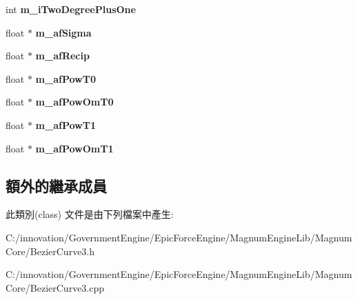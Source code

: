 \begin{DoxyCompactItemize}
\item 
int {\bfseries m\+\_\+i\+Two\+Degree\+Plus\+One}\hypertarget{class_i_dream_sky_1_1_bezier_curve3_a4541e2305ea9e03ce559b01f4544a3de}{}\label{class_i_dream_sky_1_1_bezier_curve3_a4541e2305ea9e03ce559b01f4544a3de}

\item 
float $\ast$ {\bfseries m\+\_\+af\+Sigma}\hypertarget{class_i_dream_sky_1_1_bezier_curve3_a141cb81249d80d3b75eab72b46e64b89}{}\label{class_i_dream_sky_1_1_bezier_curve3_a141cb81249d80d3b75eab72b46e64b89}

\item 
float $\ast$ {\bfseries m\+\_\+af\+Recip}\hypertarget{class_i_dream_sky_1_1_bezier_curve3_abc8251246aea2d3d4097eae83311c2b2}{}\label{class_i_dream_sky_1_1_bezier_curve3_abc8251246aea2d3d4097eae83311c2b2}

\item 
float $\ast$ {\bfseries m\+\_\+af\+Pow\+T0}\hypertarget{class_i_dream_sky_1_1_bezier_curve3_ad3b786dfda42633a8dd8181faa770b18}{}\label{class_i_dream_sky_1_1_bezier_curve3_ad3b786dfda42633a8dd8181faa770b18}

\item 
float $\ast$ {\bfseries m\+\_\+af\+Pow\+Om\+T0}\hypertarget{class_i_dream_sky_1_1_bezier_curve3_a94242010a2a20a0d60f0d9a3a350b50b}{}\label{class_i_dream_sky_1_1_bezier_curve3_a94242010a2a20a0d60f0d9a3a350b50b}

\item 
float $\ast$ {\bfseries m\+\_\+af\+Pow\+T1}\hypertarget{class_i_dream_sky_1_1_bezier_curve3_ae96ca159297327703ca4250998a19e87}{}\label{class_i_dream_sky_1_1_bezier_curve3_ae96ca159297327703ca4250998a19e87}

\item 
float $\ast$ {\bfseries m\+\_\+af\+Pow\+Om\+T1}\hypertarget{class_i_dream_sky_1_1_bezier_curve3_a4f33e0f5f9d3b9d1c6dd94935d51ee0b}{}\label{class_i_dream_sky_1_1_bezier_curve3_a4f33e0f5f9d3b9d1c6dd94935d51ee0b}

\end{DoxyCompactItemize}
\subsection*{額外的繼承成員}


此類別(class) 文件是由下列檔案中產生\+:\begin{DoxyCompactItemize}
\item 
C\+:/innovation/\+Government\+Engine/\+Epic\+Force\+Engine/\+Magnum\+Engine\+Lib/\+Magnum\+Core/Bezier\+Curve3.\+h\item 
C\+:/innovation/\+Government\+Engine/\+Epic\+Force\+Engine/\+Magnum\+Engine\+Lib/\+Magnum\+Core/Bezier\+Curve3.\+cpp\end{DoxyCompactItemize}
